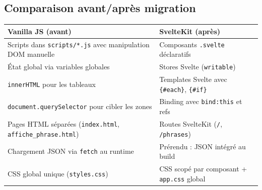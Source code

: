 \subsection{Comparaison avant/après migration}

\begin{center}
\begin{tabular}{p{}p{}}
  \toprule
  \textbf{Vanilla JS (avant)} & \textbf{SvelteKit (après)} \\
  \midrule
  Scripts dans \texttt{scripts/*.js} avec manipulation DOM manuelle & Composants \texttt{.svelte} déclaratifs \\
  \midrule
  État global via variables globales & Stores Svelte (\texttt{writable}) \\
  \midrule
  \texttt{innerHTML} pour les tableaux & Templates Svelte avec \texttt{\{\#each\}}, \texttt{\{\#if\}} \\
  \midrule
  \texttt{document.querySelector} pour cibler les zones & Binding avec \texttt{bind:this} et refs \\
  \midrule
  Pages HTML séparées (\texttt{index.html}, \texttt{affiche\_phrase.html}) & Routes SvelteKit (\texttt{/}, \texttt{/phrases}) \\
  \midrule
  Chargement JSON via \texttt{fetch} au runtime & Prérendu : JSON intégré au build \\
  \midrule
  CSS global unique (\texttt{styles.css}) & CSS scopé par composant + \texttt{app.css} global \\
  \bottomrule
\end{tabular}
\end{center}
